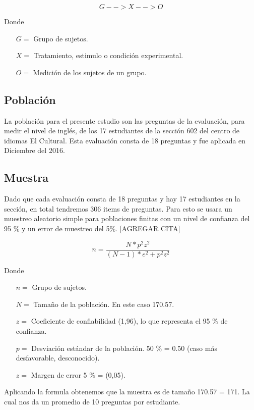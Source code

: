 \[ G  - - > X - - > O \]

\vskip 0.1cm 
Donde
\vskip 0.1cm 

\begin{itemize}
	\item [$G =$] Grupo de sujetos.
	\item [$X =$] Tratamiento, estimulo o condición experimental.
	\item [$O =$] Medición de los sujetos de un grupo.
\end{itemize}

\subsection{Población}

La población para el presente estudio son las preguntas de la evaluación, para medir el nivel de inglés, de los 17 estudiantes de la sección 602 del centro de idiomas El Cultural. Esta evaluación consta de 18 preguntas y fue aplicada en Diciembre del 2016.

\subsection{Muestra}

Dado que cada evaluación consta de 18 preguntas y hay 17 estudiantes en la sección, en total tendremos 306 items de preguntas. Para esto se usara un muestreo aleatorio simple para poblaciones finitas con un nivel de confianza del 95 \%  y un error de muestreo del 5\%. [AGREGAR CITA]

\[ n  = \frac{ N * p^{2} z^{2} } { (N - 1) * e^{2} + p^{2} z^{2} } \]

\vskip 0.1cm 
Donde
\vskip 0.1cm 

\begin{itemize}
	\item [$n =$] Grupo de sujetos.
	\item [$N =$] Tamaño de la población. En este caso 170.57.
	\item [$z =$] Coeficiente de confiabilidad (1,96), lo que representa el 95 \% de confianza.
	\item [$p =$] Desviación estándar de la población. 50 \% = 0.50 (caso más desfavorable, desconocido).
	\item [$z =$] Margen de error 5 \% = (0,05).
\end{itemize}

Aplicando la formula obtenemos que la muestra es de tamaño 170.57 = 171. La cual nos da un promedio de 10 preguntas por estudiante.


